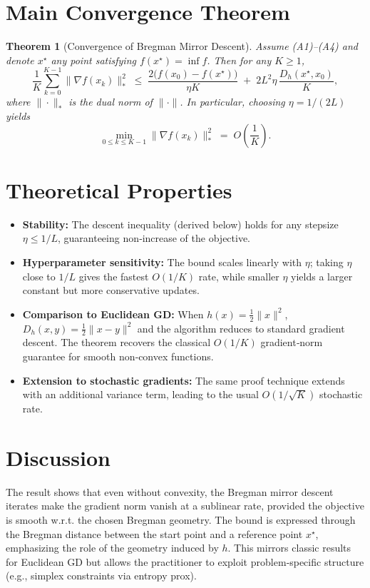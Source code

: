 \documentclass{article}
\newtheorem{theorem}{Theorem}
\newcommand{\breg}[2]{D_h(#1,#2)}
\begin{document}
\section*{Main Convergence Theorem}
\begin{theorem}[Convergence of Bregman Mirror Descent]\label{thm:main}
Assume (A1)–(A4) and denote $x^\star$ any point satisfying $f(x^\star)=\inf f$. Then for any $K\ge1$,
\[
\frac{1}{K}\sum_{k=0}^{K-1}\|\nabla f(x_k)\|_{*}^{2}
\;\le\;
\frac{2\big(f(x_0)-f(x^\star)\big)}{\eta K}
\;+\;
2L^{2}\eta\,
\frac{\breg{x^\star}{x_0}}{K},
\]
where $\|\cdot\|_{*}$ is the dual norm of $\|\cdot\|$. In particular, choosing $\eta=1/(2L)$ yields
\[
\min_{0\le k\le K-1}\|\nabla f(x_k)\|_{*}^{2}
\;=\;O\!\left(\frac{1}{K}\right).
\]
\end{theorem}

\section*{Theoretical Properties}
\begin{itemize}
\item \textbf{Stability:} The descent inequality (derived below) holds for any stepsize $\eta\le 1/L$, guaranteeing non‑increase of the objective.
\item \textbf{Hyperparameter sensitivity:} The bound scales linearly with $\eta$; taking $\eta$ close to $1/L$ gives the fastest $O(1/K)$ rate, while smaller $\eta$ yields a larger constant but more conservative updates.
\item \textbf{Comparison to Euclidean GD:} When $h(x)=\tfrac12\|x\|^{2}$, $\breg{x}{y}=\tfrac12\|x-y\|^{2}$ and the algorithm reduces to standard gradient descent. The theorem recovers the classical $O(1/K)$ gradient‑norm guarantee for smooth non‑convex functions.
\item \textbf{Extension to stochastic gradients:} The same proof technique extends with an additional variance term, leading to the usual $O(1/\sqrt{K})$ stochastic rate.
\end{itemize}

\section*{Discussion}
The result shows that even without convexity, the Bregman mirror descent iterates make the gradient norm vanish at a sublinear rate, provided the objective is smooth w.r.t. the chosen Bregman geometry. The bound is expressed through the Bregman distance between the start point and a reference point $x^\star$, emphasizing the role of the geometry induced by $h$. This mirrors classic results for Euclidean GD but allows the practitioner to exploit problem‑specific structure (e.g., simplex constraints via entropy prox).
\end{document}
